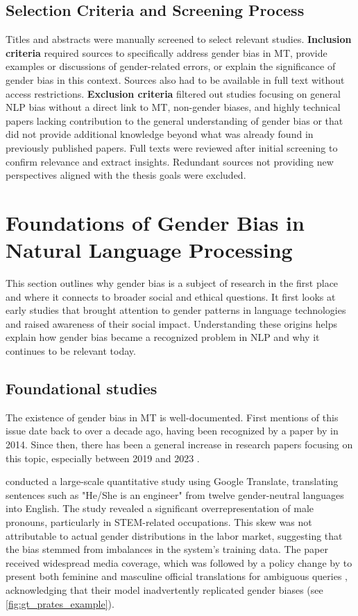 \subsection{Selection Criteria and Screening Process}\label{subsection:selection_criteria}
Titles and abstracts were manually screened to select relevant studies. \textbf{Inclusion criteria} required sources to specifically address gender bias in MT, provide examples or discussions of gender-related errors, or explain the significance of gender bias in this context. Sources also had to be available in full text without access restrictions. \textbf{Exclusion criteria} filtered out studies focusing on general NLP bias without a direct link to MT, non-gender biases, and highly technical papers lacking contribution to the general understanding of gender bias or that did not provide additional knowledge beyond what was already found in previously published papers. Full texts were reviewed after initial screening to confirm relevance and extract insights. Redundant sources not providing new perspectives aligned with the thesis goals were excluded.

\section{Foundations of Gender Bias in Natural Language Processing}

This section outlines why gender bias is a subject of research in the first place and where it connects to broader social and ethical questions. It first looks at early studies that brought attention to gender patterns in language technologies and raised awareness of their social impact. Understanding these origins helps explain how gender bias became a recognized problem in NLP and why it continues to be relevant today.

\subsection{Foundational studies}
The existence of gender bias in MT is well-documented. First mentions of this issue date back to over a decade ago, having been recognized by a paper by \citeauthor{schiebingerScientificResearchMust2014} in 2014. Since then, there has been a general increase in research papers focusing on this topic, especially between 2019 and 2023 \citep{savoldiDecadeGenderBias2025}.

\textbf{\citet{pratesAssessingGenderBias2019}} conducted a large-scale quantitative study using Google Translate, translating sentences such as "He/She is an engineer" from twelve gender-neutral languages into English. The study revealed a significant overrepresentation of male pronouns, particularly in STEM-related occupations. This skew was not attributable to actual gender distributions in the labor market, suggesting that the bias stemmed from imbalances in the system’s training data. The paper received widespread media coverage, which was followed by a policy change by \citeauthor{googleReducingGenderBias2018} to present both feminine and masculine official translations for ambiguous queries \citep{googleReducingGenderBias2018}, acknowledging that their model inadvertently replicated gender biases (see \autoref{fig:gt_prates_example}). 

